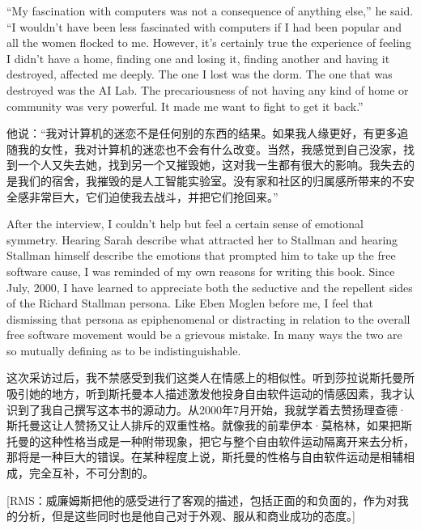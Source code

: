 \ifdefined\eng
``My fascination with computers was not a consequence of anything else,'' he said. ``I wouldn't have been less fascinated with computers if I had been popular and all the women flocked to me. However, it's certainly true the experience of feeling I didn't have a home, finding one and losing it, finding another and having it destroyed, affected me deeply. The one I lost was the dorm. The one that was destroyed was the AI Lab. The precariousness of not having any kind of home or community was very powerful. It made me want to fight to get it back.''
\fi

\ifdefined\chs
他说：``我对计算机的迷恋不是任何别的东西的结果。如果我人缘更好，有更多追随我的女性，我对计算机的迷恋也不会有什么改变。当然，我感觉到自己没家，找到一个人又失去她，找到另一个又摧毁她，这对我一生都有很大的影响。我失去的是我们的宿舍，我摧毁的是人工智能实验室。没有家和社区的归属感所带来的不安全感非常巨大，它们迫使我去战斗，并把它们抢回来。''
\fi

\ifdefined\eng
After the interview, I couldn't help but feel a certain sense of emotional symmetry. Hearing Sarah describe what attracted her to Stallman and hearing Stallman himself describe the emotions that prompted him to take up the free software cause, I was reminded of my own reasons for writing this book. Since July, 2000, I have learned to appreciate both the seductive and the repellent sides of the Richard Stallman persona. Like Eben Moglen before me, I feel that dismissing that persona as epiphenomenal or distracting in relation to the overall free software movement would be a grievous mistake. In many ways the two are so mutually defining as to be indistinguishable.
\fi

\ifdefined\chs
这次采访过后，我不禁感受到我们这类人在情感上的相似性。听到莎拉说斯托曼所吸引她的地方，听到斯托曼本人描述激发他投身自由软件运动的情感因素，我才认识到了我自己撰写这本书的源动力。从2000年7月开始，我就学着去赞扬理查德·斯托曼这让人赞扬又让人排斥的双重性格。就像我的前辈伊本·莫格林，如果把斯托曼的这种性格当成是一种附带现象，把它与整个自由软件运动隔离开来去分析，那将是一种巨大的错误。在某种程度上说，斯托曼的性格与自由软件运动是相辅相成，完全互补，不可分割的。
\fi

\ifdefined\vtwo
\ifdefined{}
\fi

\ifdefined\chs
[RMS：威廉姆斯把他的感受进行了客观的描述，包括正面的和负面的，作为对我的分析，但是这些同时也是他自己对于外观、服从和商业成功的态度。]
\fi
\fi

